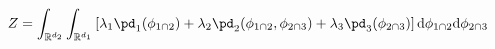 \begin{equation}
Z = \int_{\mathbb{R}^{d_{2}}}
  \int_{\mathbb{R}^{d_{1}}}
  \left[ 
    \lambda_{1} \pd_{1}(\phi_{1 \cap 2}) + 
    \lambda_{2} \pd_{2}(\phi_{1 \cap 2}, \phi_{2 \cap 3}) + 
    \lambda_{3} \pd_{3}(\phi_{2 \cap 3})
  \right]
  \text{d}\phi_{1 \cap 2}
  \text{d}\phi_{2 \cap 3}
  \label{eqn:int-linear-pooling-1} 
\end{equation}